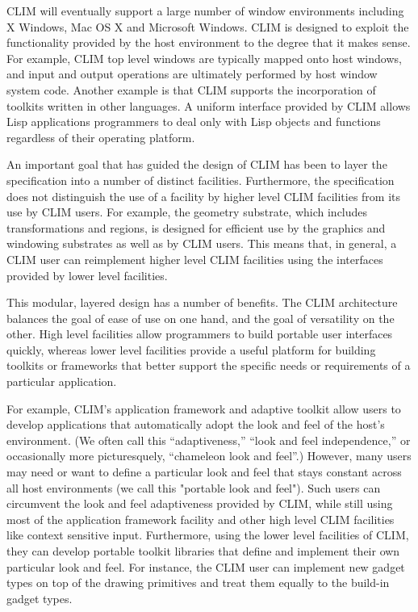 \documentclass[twocolumn,a4paper]{article}
\newcommand {\CLIM}{{\small CLIM}}
\begin{document}
\CLIM{} will eventually support a large number of window environments
including X Windows, Mac OS X and Microsoft Windows. \CLIM{} is
designed to exploit the functionality provided by the host environment
to the degree that it makes sense. For example, \CLIM{} top level
windows are typically mapped onto host windows, and input and output
operations are ultimately performed by host window system
code. Another example is that \CLIM{} supports the incorporation of
toolkits written in other languages. A uniform interface provided by
\CLIM{} allows Lisp applications programmers to deal only with Lisp
objects and functions regardless of their operating platform.

An important goal that has guided the design of \CLIM{} has been to
layer the specification into a number of distinct
facilities. Furthermore, the specification does not distinguish the
use of a facility by higher level \CLIM{} facilities from its use by
\CLIM{} users. For example, the geometry substrate, which includes
transformations and regions, is designed for efficient use by the
graphics and windowing substrates as well as by \CLIM{} users. This
means that, in general, a \CLIM{} user can reimplement higher level
\CLIM{} facilities using the interfaces provided by lower level
facilities.

This modular, layered design has a number of benefits. The \CLIM{}
architecture balances the goal of ease of use on one hand, and the
goal of versatility on the other. High level facilities allow
programmers to build portable user interfaces quickly, whereas lower
level facilities provide a useful platform for building toolkits or
frameworks that better support the specific needs or requirements of a
particular application.

For example, \CLIM{}'s application framework and adaptive toolkit
allow users to develop applications that automatically adopt the look
and feel of the host's environment. (We often call this
``adaptiveness,'' ``look and feel independence,'' or occasionally more
picturesquely, ``chameleon look and feel''.) However, many users may
need or want to define a particular look and feel that stays constant
across all host environments (we call this "portable look and
feel"). Such users can circumvent the look and feel adaptiveness
provided by \CLIM{}, while still using most of the application
framework facility and other high level \CLIM{} facilities like
context sensitive input. Furthermore, using the lower level facilities
of \CLIM{}, they can develop portable toolkit libraries that define
and implement their own particular look and feel. For instance, the
\CLIM{} user can implement new gadget types on top of the drawing
primitives and treat them equally to the build-in gadget types.
\end{document}
